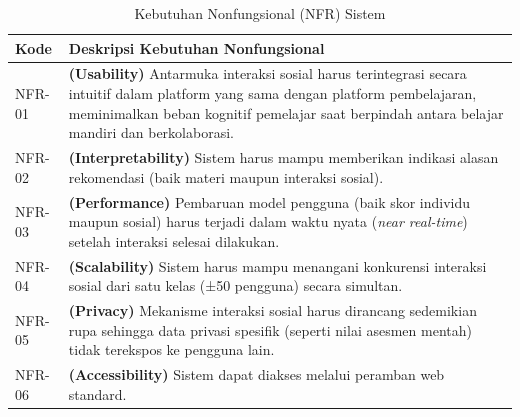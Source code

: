 \begin{table}[H]
    \centering\caption{Kebutuhan Nonfungsional (NFR) Sistem}\label{tbl:kebutuhan-nonfungsional}
\renewcommand{\arraystretch}{1.3}
\begin{tabular}{|l|p{}|}
\hline
\textbf{Kode} & \textbf{Deskripsi Kebutuhan Nonfungsional} \\
\hline
NFR-01 & \textbf{(Usability)} Antarmuka interaksi sosial harus terintegrasi secara intuitif dalam platform yang sama dengan platform pembelajaran, meminimalkan beban kognitif pemelajar saat berpindah antara belajar mandiri dan berkolaborasi. \\
\hline
NFR-02 & \textbf{(Interpretability)} Sistem harus mampu memberikan indikasi alasan rekomendasi (baik materi maupun interaksi sosial). \\
\hline
NFR-03 & \textbf{(Performance)} Pembaruan model pengguna (baik skor individu maupun sosial) harus terjadi dalam waktu nyata (\textit{near real-time}) setelah interaksi selesai dilakukan. \\
\hline
NFR-04 & \textbf{(Scalability)} Sistem harus mampu menangani konkurensi interaksi sosial dari satu kelas (±50 pengguna) secara simultan. \\
\hline
NFR-05 & \textbf{(Privacy)} Mekanisme interaksi sosial harus dirancang sedemikian rupa sehingga data privasi spesifik (seperti nilai asesmen mentah) tidak terekspos ke pengguna lain. \\
\hline
NFR-06 & \textbf{(Accessibility)} Sistem dapat diakses melalui peramban web standard. \\
\hline
\end{tabular}
\end{table}